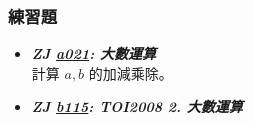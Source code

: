 \subsubsection*{練習題}
\begin{itemize}[label={\Checkmark}]
\item \textbf{\textit{ZJ \href{http://zerojudge.tw/ShowProblem?problemid=a021}{a021}: 大數運算}}\\
計算 $a,b$ 的加減乘除。
\item \textbf{\textit{ZJ \href{http://zerojudge.tw/ShowProblem?problemid=b115}{b115}: TOI2008 2. 大數運算}}\\

\end{itemize}